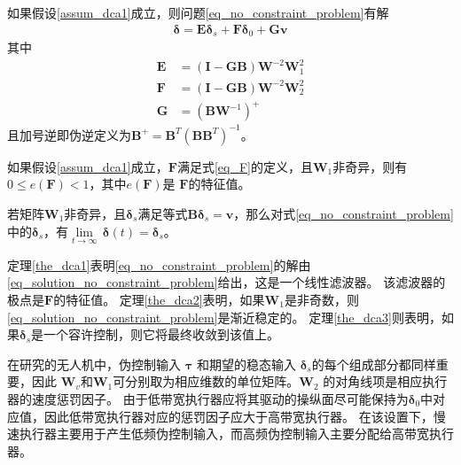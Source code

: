 \begin{theorem}
	如果假设\ref{assum_dca1}成立，则问题\eqref{eq_no_constraint_problem}有解
	\begin{align}
	\bm{\delta} = \bm{E}{\bm{\delta}_{{s}}} + \bm{F}{\bm{\delta}_{{0}}} + \bm{Gv} \label{eq_solution_no_constraint_problem}
	\end{align}
	其中
	\begin{align}
	\bm{E} &=\left( \bm{I}-\bm{GB} \right){{\bm{W}}^{-2}}\bm{W}_{1}^{2}\\
	\bm{F} &=\left( \bm{I}-\bm{GB} \right){{\bm{W}}^{-2}}\bm{W}_{2}^{2}	\label{eq_F} \\
	\bm{G} &=\left( \bm{B}{{\bm{W}}^{-1}} \right)^{+}
	\end{align}
	且加号逆即伪逆定义为$ 	{{\bm{B}}^{+}}={{\bm{B}}^{{T}}}{{\left( \bm{B}{{\bm{B}}^{{T}}} \right)}^{-1}} $。	\label{the_dca1}
\end{theorem}
\begin{theorem}
	如果假设\ref{assum_dca1}成立，$\bm{F}$满足式\eqref{eq_F}的定义，且${{\bm{W}}_{1}}$非奇异，则有$0\le e \left( \bm{F} \right) < 1$，其中$e \left( \bm{F} \right)$是 $\bm{F}$的特征值。	\label{the_dca2}
\end{theorem}
\begin{theorem}
	若矩阵${{\bm{W}}_{1}}$非奇异，且$\bm{\delta}_{ {s}}$满足等式$\bm{B}\bm{\delta}_{ {s}}=\bm{v}$，那么对式\eqref {eq_no_constraint_problem}中的$\bm{\delta}_{ {s}}$，有$\underset{t\to \infty }{\mathop{\lim }}\,\bm{\delta}\left( t \right)={{\bm{\delta}}_{ {s}}}$。	\label{the_dca3}
\end{theorem}

定理\ref{the_dca1}表明\eqref{eq_no_constraint_problem}的解由\eqref{eq_solution_no_constraint_problem}给出，这是一个线性滤波器。 该滤波器的极点是$\bm{F}$的特征值。 定理\ref{the_dca2}表明，如果${{\bm{W}}_{1}}$是非奇数，则\eqref{eq_solution_no_constraint_problem}是渐近稳定的。 定理\ref{the_dca3}则表明，如果$\bm{\delta}_{ {s}}$是一个容许控制，则它将最终收敛到该值上。

在研究的无人机中，伪控制输入 $\bm{\tau}$ 和期望的稳态输入 ${{\bm{\delta}}_{ {s}}}$的每个组成部分都同样重要，因此 ${{\bm{W}}_{ {v}}}$和${{\bm{W}}_{1}}$可分别取为相应维数的单位矩阵。${{\bm{W}}_{2}}$ 的对角线项是相应执行器的速度惩罚因子。 由于低带宽执行器应将其驱动的操纵面尽可能保持为${{\bm{ \delta}}_{0}}$中对应值，因此低带宽执行器对应的惩罚因子应大于高带宽执行器。 在该设置下，慢速执行器主要用于产生低频伪控制输入，而高频伪控制输入主要分配给高带宽执行器。 

